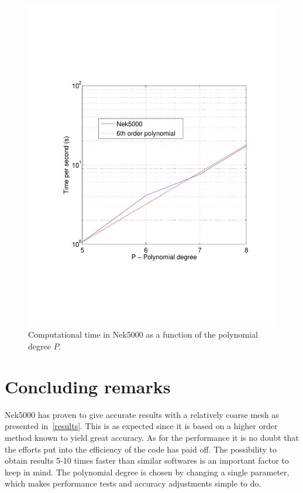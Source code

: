 \begin{figure}[h]
{\begin{minipage}{.6\textwidth}
  \includegraphics[trim=0.5cm 3cm 0.5cm 7cm,width=1.0\linewidth]{Figures/tpers.pdf}
\end{minipage}%
}
  \caption{Computational time in Nek5000 as a function of the polynomial degree $P$. }
  \label{fig:comptime}
\end{figure}
%
\chapter{Concluding remarks} \label{discussion}
Nek5000 has proven to give accurate results with a relatively coarse mesh as
presented in~\cref{results}. This is as expected since it is based on a higher order 
method known to yield great accuracy. As for the performance it is no doubt that the 
efforts put into the efficiency of the code has paid off. The possibility to obtain 
results 5-10 times faster than similar softwares is an important factor to keep in mind. 
The polynomial degree is chosen by changing a single parameter, which makes performance tests
and accuracy adjustments simple to do. 


